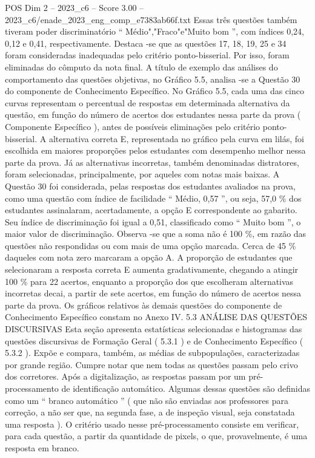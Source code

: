 \begin{textsample}{POS Dim 2 – 2023\_c6 – Score 3.00 – 2023\_c6/enade\_2023\_eng\_comp\_e7383ab66f.txt}
Essas três questões também tiveram poder discriminatório “ Médio","Fraco"e"Muito bom ”, com índices 0,24, 0,12 e 0,41, respectivamente.
Destaca -se que as questões 17, 18, 19, 25 e 34 foram consideradas inadequadas pelo critério ponto-bisserial.
Por isso, foram eliminadas do cômputo da nota final.
A título de exemplo das análises do comportamento das questões objetivas, no Gráfico 5.5, analisa -se a Questão 30 do componente de Conhecimento Específico.
No Gráfico 5.5, cada uma das cinco curvas representam o percentual de respostas em determinada alternativa da questão, em função do número de acertos dos estudantes nessa parte da prova ( Componente Específico ), antes de possíveis eliminações pelo critério ponto-bisserial.
A alternativa correta E, representada no gráfico pela curva em lilás, foi escolhida em maiores proporções pelos estudantes com desempenho melhor nessa parte da prova.
Já as alternativas incorretas, também denominadas distratores, foram selecionadas, principalmente, por aqueles com notas mais baixas.
A Questão 30 foi considerada, pelas respostas dos estudantes avaliados na prova, como uma questão com índice de facilidade “ Médio, 0,57 ”, ou seja, 57,0 \% dos estudantes assinalaram, acertadamente, a opção E correspondente ao gabarito.
Seu índice de discriminação foi igual a 0,51, classificado como “ Muito bom ”, o maior valor de discriminação.
Observa -se que a soma não é 100 \%, em razão das questões não respondidas ou com mais de uma opção marcada.
Cerca de 45 \% daqueles com nota zero marcaram a opção A.
A proporção de estudantes que selecionaram a resposta correta E aumenta gradativamente, chegando a atingir 100 \% para 22 acertos, enquanto a proporção dos que escolheram alternativas incorretas decai, a partir de sete acertos, em função do número de acertos nessa parte da prova.
Os gráficos relativos às demais questões do componente de Conhecimento Específico constam no Anexo IV. 5.3 ANÁLISE DAS QUESTÕES DISCURSIVAS Esta seção apresenta estatísticas selecionadas e histogramas das questões discursivas de Formação Geral ( 5.3.1 ) e de Conhecimento Específico ( 5.3.2 ).
Expõe e compara, também, as médias de subpopulações, caracterizadas por grande região.
Cumpre notar que nem todas as questões passam pelo crivo dos corretores.
Após a digitalização, as respostas passam por um pré-processamento de identificação automático.
Algumas dessas questões são definidas como um “ branco automático ” ( que não são enviadas aos professores para correção, a não ser que, na segunda fase, a de inspeção visual, seja constatada uma resposta ).
O critério usado nesse pré-processamento consiste em verificar, para cada questão, a partir da quantidade de pixels, o que, provavelmente, é uma resposta em branco.

\end{textsample}
